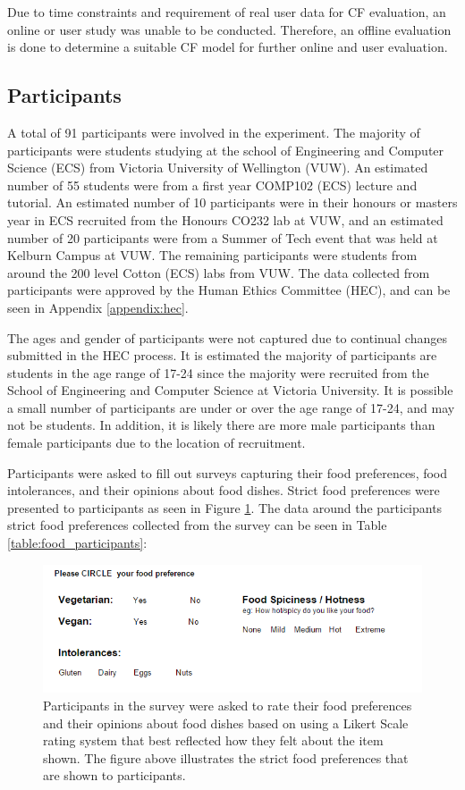 Due to time constraints and requirement of real user data for CF evaluation, an online or user study was unable to be conducted. Therefore, an offline evaluation is done to determine a suitable CF model for further online and user evaluation. 

\subsection{Participants}

A total of 91 participants were involved in the experiment. The majority of participants were students studying at the school of Engineering and Computer Science (ECS) from Victoria University of Wellington (VUW). An estimated number of 55 students were from a first year COMP102 (ECS) lecture and tutorial. An estimated number of 10 participants were in their honours or masters year in ECS recruited from the Honours CO232 lab at VUW, and an estimated number of 20 participants were from a Summer of Tech event that was held at Kelburn Campus at VUW. The remaining participants were students from around the 200 level Cotton (ECS) labs from VUW. The data collected from participants were approved by the Human Ethics Committee (HEC), and can be seen in Appendix \ref{appendix:hec}.

The ages and gender of participants were not captured due to continual changes submitted in the HEC process. It is estimated the majority of participants are students in the age range of 17-24 since the majority were recruited from the School of Engineering and Computer Science at Victoria University. It is possible a small number of participants are under or over the age range of 17-24, and may not be students. In addition, it is likely there are more male participants than female participants due to the location of recruitment.

Participants were asked to fill out surveys capturing their food preferences, food intolerances, and their opinions about food dishes. Strict food preferences were presented to participants as seen in Figure \ref{fig:strict_prefs}. The data around the participants strict food preferences collected from the survey can be seen in Table \ref{table:food_participants}:

\begin{figure}
\centering
\includegraphics[scale=0.8]{images/strict_prefs.png}
\caption{Participants in the survey were asked to rate their food preferences and their opinions about food dishes based on using a Likert Scale rating system that best reflected how they felt about the item shown. The figure above illustrates the strict food preferences that are shown to participants.}
\label{fig:strict_prefs}
\end{figure}

